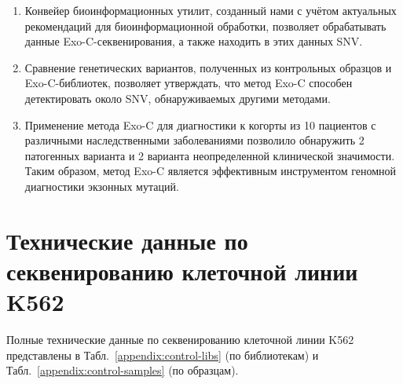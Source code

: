 \documentclass[a4paper,14pt]{extarticle}
\newcommand{\thousands}{тыс.}
\newcommand{\mln}{млн}
\newcommand{\tableref}[1]{Табл.~\ref{#1}}
\begin{document}
\begin{enumerate}
	\item Конвейер биоинформационных утилит, созданный нами с учётом актуальных рекомендаций для биоинформационной обработки, позволяет обрабатывать данные Exo-C\hyp{}секвенирования, а также находить в этих данных SNV.
	\item Сравнение генетических вариантов, полученных из контрольных образцов и Exo-C\hyp{}библиотек, позволяет утверждать, что метод Exo-C способен детектировать около  SNV, обнаруживаемых другими методами.
	\item Применение метода Exo-C для диагностики к когорты из 10 пациентов с различными наследственными заболеваниями позволило обнаружить 2 патогенных варианта и 2 варианта неопределенной клинической значимости. Таким образом, метод Exo-C является эффективным инструментом геномной диагностики экзонных мутаций.
\end{enumerate}

\newpage

\renewcommand\refname{Список литературы}

\newpage

\appendix
{}
\section{\label{appendix:sequence-stats}Технические данные по секвенированию клеточной линии K562}

Полные технические данные по секвенированию клеточной линии K562 представлены в \tableref{appendix:control-libs} (по библиотекам) и \tableref{appendix:control-samples} (по образцам).
\end{document}
